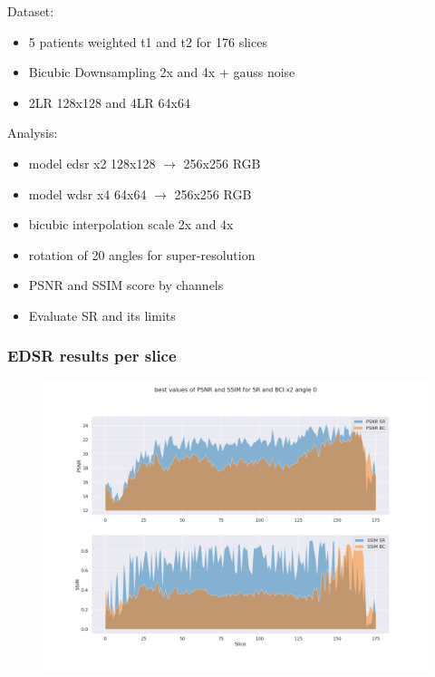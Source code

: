 \documentclass{beamer}
\begin{document}
\begin{frame}
 Dataset:
 \begin{itemize}
  \item 5 patients weighted t1 and t2 for 176 slices
  \item Bicubic Downsampling 2x and 4x + gauss noise
  \item 2LR 128x128 and 4LR 64x64 
 \end{itemize}
 
Analysis:
 \begin{itemize}
  \item model edsr x2 128x128 $\rightarrow$ 256x256 RGB
  \item model wdsr x4  64x64  $\rightarrow$ 256x256 RGB 
  \item bicubic interpolation scale 2x and 4x
  \item rotation of 20 angles for super-resolution
  \item PSNR and SSIM score by channels 
  \item Evaluate SR and its limits
 \end{itemize}

\end{frame}


  
\begin{frame}
\frametitle{EDSR results per slice}
  \begin{figure}
  \includegraphics[scale=0.22]{images/PSNR-SSIM_sr-bc_x2_000.png}
 \end{figure}
\end{frame}
\end{document}
